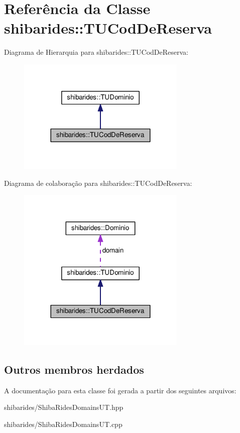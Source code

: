 \hypertarget{classshibarides_1_1TUCodDeReserva}{}\section{Referência da Classe shibarides\+:\+:T\+U\+Cod\+De\+Reserva}
\label{classshibarides_1_1TUCodDeReserva}


Diagrama de Hierarquia para shibarides\+:\+:T\+U\+Cod\+De\+Reserva\+:\nopagebreak
\begin{figure}[H]
\begin{center}
\leavevmode
\includegraphics[width=228pt]{classshibarides_1_1TUCodDeReserva__inherit__graph}
\end{center}
\end{figure}


Diagrama de colaboração para shibarides\+:\+:T\+U\+Cod\+De\+Reserva\+:\nopagebreak
\begin{figure}[H]
\begin{center}
\leavevmode
\includegraphics[width=228pt]{classshibarides_1_1TUCodDeReserva__coll__graph}
\end{center}
\end{figure}
\subsection*{Outros membros herdados}


A documentação para esta classe foi gerada a partir dos seguintes arquivos\+:\begin{DoxyCompactItemize}
\item 
shibarides/Shiba\+Rides\+Domains\+U\+T.\+hpp\item 
shibarides/Shiba\+Rides\+Domains\+U\+T.\+cpp\end{DoxyCompactItemize}
